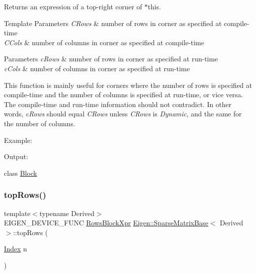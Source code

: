 \begin{DoxyReturn}{Returns}
an expression of a top-\/right corner of $\ast$this.
\end{DoxyReturn}

\begin{DoxyTemplParams}{Template Parameters}
{\em C\+Rows} & number of rows in corner as specified at compile-\/time \\
\hline
{\em C\+Cols} & number of columns in corner as specified at compile-\/time \\
\hline
\end{DoxyTemplParams}

\begin{DoxyParams}{Parameters}
{\em c\+Rows} & number of rows in corner as specified at run-\/time \\
\hline
{\em c\+Cols} & number of columns in corner as specified at run-\/time\\
\hline
\end{DoxyParams}
This function is mainly useful for corners where the number of rows is specified at compile-\/time and the number of columns is specified at run-\/time, or vice versa. The compile-\/time and run-\/time information should not contradict. In other words, {\itshape c\+Rows} should equal {\itshape C\+Rows} unless {\itshape C\+Rows} is {\itshape Dynamic}, and the same for the number of columns.

Example\+: 
\begin{DoxyCodeInclude}{0}
\end{DoxyCodeInclude}
 Output\+: 
\begin{DoxyVerbInclude}
\end{DoxyVerbInclude}
 class \mbox{\hyperlink{class_eigen_1_1_block}{Block}} \mbox{\label{class_eigen_1_1_sparse_matrix_base_ab620d8edbf8f0d9369a7f2f9956228eb}} 
\subsubsection{\texorpdfstring{topRows()}{topRows()}\hspace{0.1cm}{\footnotesize\ttfamily [1/2]}}
{\footnotesize\ttfamily template$<$typename Derived$>$ \\
E\+I\+G\+E\+N\+\_\+\+D\+E\+V\+I\+C\+E\+\_\+\+F\+U\+NC \mbox{\hyperlink{class_eigen_1_1_block}{Rows\+Block\+Xpr}} \mbox{\hyperlink{class_eigen_1_1_sparse_matrix_base}{Eigen\+::\+Sparse\+Matrix\+Base}}$<$ Derived $>$\+::top\+Rows (\begin{DoxyParamCaption}\item[{\mbox{\hyperlink{struct_eigen_1_1_eigen_base_a554f30542cc2316add4b1ea0a492ff02}{Index}}}]{n }\end{DoxyParamCaption})\hspace{0.3cm}{\ttfamily [inline]}}

